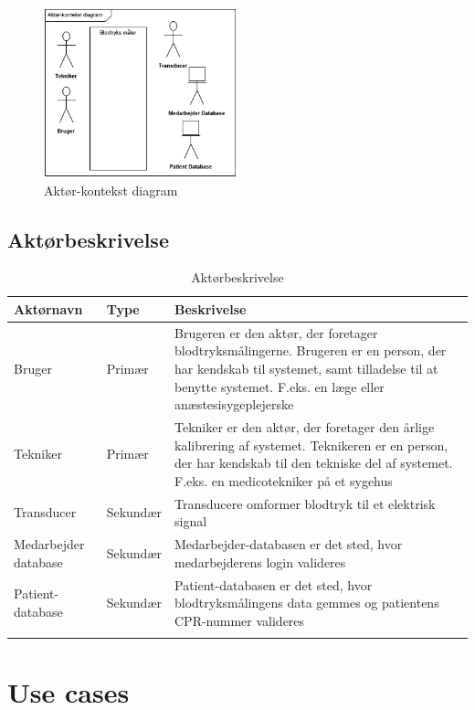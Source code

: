 \begin{figure}[H]
	\centering
	\includegraphics[width=0.5\textwidth]{Figurer/ISE/aktdiagram2}
	\caption{Aktør-kontekst diagram}
	\label{Aktdiagram}
\end{figure}


\subsection{Aktørbeskrivelse}

\begin{longtabu}to 
	{\large \textbf{Aktørnavn}} & {\large \textbf{Type}} & {\large \textbf{Beskrivelse}}\\ \toprule
	Bruger & Primær & Brugeren er den aktør, der foretager blodtryksmålingerne. Brugeren er en person, der har kendskab til systemet, samt tilladelse til at benytte systemet. F.eks. en læge eller anæstesisygeplejerske \\
	Tekniker & Primær & Tekniker er den aktør, der foretager den årlige kalibrering af systemet. Teknikeren er en person, der har kendskab til den tekniske del af systemet. F.eks. en medicotekniker på et sygehus\\
	Transducer & Sekundær & Transducere omformer blodtryk til et elektrisk signal\\
	Medarbejder database & Sekundær & Medarbejder-databasen er det sted, hvor medarbejderens login valideres \\
	Patient-database & Sekundær & Patient-databasen er det sted, hvor blodtryksmålingens data gemmes og patientens CPR-nummer valideres \\ \bottomrule
\caption{Aktørbeskrivelse}
\label{Aktoerbeskrivelse}
\end{longtabu}

\section{Use cases}
